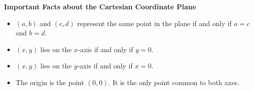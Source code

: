 \documentclass{ximera}
\begin{document}
 
\label{importantfactscartesianplane}


% 

\centerline{\textbf{Important Facts about the Cartesian Coordinate Plane}}

\begin{itemize}

\item $(a,b)$ and $(c,d)$ represent the same point in the plane if and only if $a = c$ and $b = d$.

\item  $(x,y)$ lies on the $x$-axis if and only if $y = 0$.

\item  $(x,y)$ lies on the $y$-axis if and only if $x=0$.

\item The origin is the point $(0,0)$.  It is the only point common to both axes.

% 

\end{itemize}


\pagebreak
\end{document}
